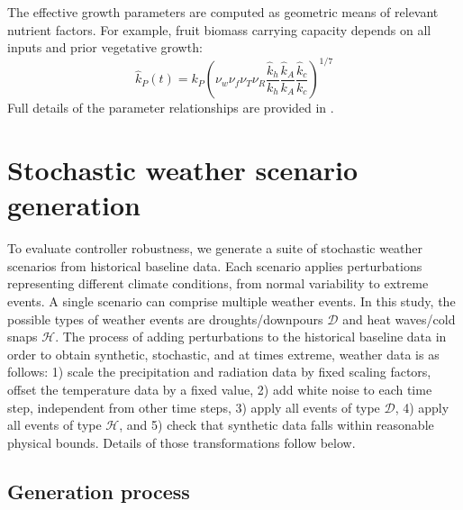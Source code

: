 \documentclass[preprint,12pt]{elsarticle}
\newcommand{\df}[2]{\displaystyle\frac{#1}{#2}}
\begin{document}
The effective growth parameters are computed as geometric means of relevant nutrient factors. For example, fruit biomass carrying capacity depends on all inputs and prior vegetative growth:
\begin{equation}
\hat{k}_P(t) = k_P \left(\nu_w \nu_f \nu_T \nu_R \df{\hat{k}_h}{k_h} \df{\hat{k}_A}{k_A} \df{\hat{k}_c}{k_c}\right)^{1/7}
\label{eqn:fruit-capacity}
\end{equation}
Full details of the parameter relationships are provided in \cite{becker2025ga}.


\section{Stochastic weather scenario generation}\label{sec:weather}

To evaluate controller robustness, we generate a suite of stochastic weather scenarios from historical baseline data. Each scenario applies perturbations representing different climate conditions, from normal variability to extreme events. A single scenario can comprise multiple weather events. In this study, the possible types of weather events are droughts/downpours $\mathcal{D}$ and heat waves/cold snaps $\mathcal{H}$. The process of adding perturbations to the historical baseline data in order to obtain synthetic, stochastic, and at times extreme, weather data is as follows: 1) scale the precipitation and radiation data by fixed scaling factors, offset the temperature data by a fixed value, 2) add white noise to each time step, independent from other time steps, 3) apply all events of type $\mathcal{D}$, 4) apply all events of type $\mathcal{H}$, and 5) check that synthetic data falls within reasonable physical bounds. Details of those transformations follow below.

\subsection{Generation process}\label{subsec:weather-generation}
\end{document}
